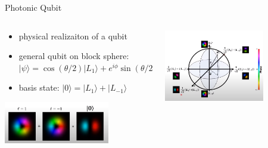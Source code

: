 \documentclass[aspectratio=169,9pt]{beamer}
\begin{document}
\begin{frame}[t]{Photonic Qubit}
  \begin{columns}
    \begin{column}[]{0.5\textwidth}
      \begin{itemize}
        \item physical realizaiton of a qubit
        \item general qubit on block sphere: $|\psi\rangle=\cos(\theta/2)|L_1\rangle + e^{i\phi}\sin(\theta/2)|L_{-1}\rangle$
        \item basis state: $|0\rangle= |L_1\rangle + |L_{-1}\rangle$
      \end{itemize}
      \includegraphics[width=0.7\textwidth]{photonic_superposition_qubit.png}
    \end{column}
    \begin{column}[]{0.5\textwidth}
      \includegraphics[width=0.7\textwidth]{photonic_bloch_sphere.png}
    \end{column}
  \end{columns}
\end{frame}
\end{document}
